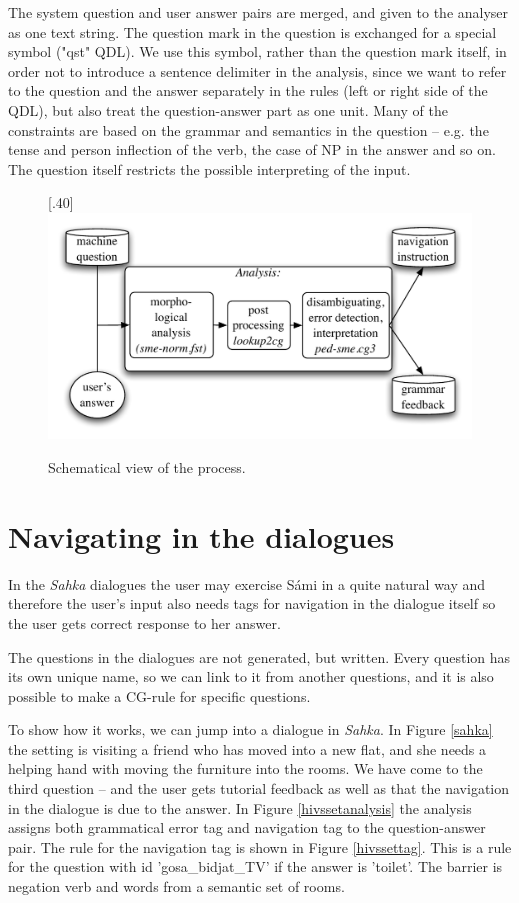 \documentclass[11pt]{article}
\begin{document}
The system question and user answer pairs are merged, and given to the analyser as one text string. The question mark in the question is exchanged for a special symbol ("qst" QDL). We use this symbol, rather than the question mark itself, in order not to introduce a sentence delimiter in the analysis, since we want to refer to the question and the answer separately in the rules (left or right side of the QDL), but also treat the question-answer part as one unit. Many of the constraints are based on the grammar and semantics in the question -- e.g. the tense and person inflection of the verb, the case of NP in the answer and so on. The question itself restricts the possible interpreting of the input.


\begin{figure}[htbp]
\begin{center}
\scalebox{.40}[.40]{\includegraphics{presentation/img/qa2.pdf}}\\
\caption{Schematical view of the process.}
\end{center}
\end{figure}


\section{Navigating in the dialogues}
In the \textit{Sahka} dialogues the user may exercise Sámi in a quite natural way and therefore the user's input also needs tags for navigation in the dialogue itself so the user gets correct response to her answer.

The questions in the dialogues are not generated, but written. Every question has its own unique name, so we can link to it from another questions, and it is also possible to make a CG-rule for specific questions.  

To show how it works, we can jump into a dialogue in \textit{Sahka}. In Figure \ref{sahka} the setting is visiting a friend who has moved into a new flat, and she needs a helping hand with moving the furniture into the rooms. We have come to the third question – and the user gets tutorial feedback as well as that the navigation in the dialogue is due to the answer. In Figure \ref{hivssetanalysis} the analysis assigns both grammatical error tag  and navigation tag to the question-answer pair. The rule for the navigation tag is shown in Figure \ref{hivssettag}. This is a rule for the question with id 'gosa\_bidjat\_TV' if the answer is 'toilet'. The barrier is negation verb and words from a semantic set of rooms.
 
\end{document}
